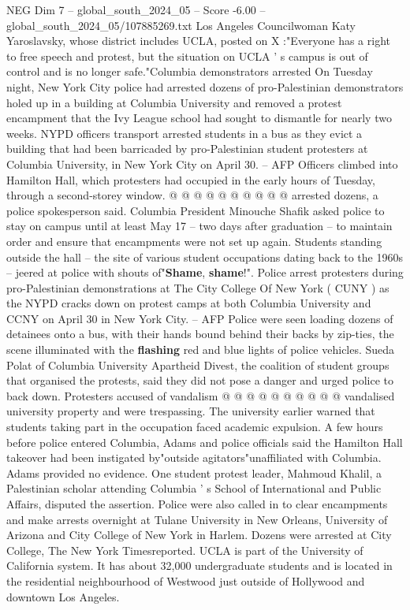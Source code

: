 \begin{textsample}{NEG Dim 7 – global\_south\_2024\_05 – Score -6.00 – global\_south\_2024\_05/107885269.txt}
Los Angeles Councilwoman Katy Yaroslavsky, whose district includes UCLA, posted on X :"Everyone has a right to free speech and protest, but the situation on UCLA ' s campus is out of control and is no longer safe."Columbia demonstrators arrested On Tuesday night, New York City police had arrested dozens of pro-Palestinian demonstrators holed up in a building at Columbia University and removed a protest encampment that the Ivy League school had sought to dismantle for nearly two weeks.
NYPD officers transport arrested students in a bus as they evict a building that had been barricaded by pro-Palestinian student protesters at Columbia University, in New York City on April 30. -- AFP Officers climbed into Hamilton Hall, which protesters had occupied in the early hours of Tuesday, through a second-storey window. @ @ @ @ @ @ @ @ @ @ arrested dozens, a police spokesperson said.
Columbia President Minouche Shafik asked police to stay on campus until at least May 17 -- two days after graduation -- to maintain order and ensure that encampments were not set up again.
Students standing outside the hall -- the site of various student occupations dating back to the 1960s -- jeered at police with shouts of"\textbf{Shame}, \textbf{shame}!".
Police arrest protesters during pro-Palestinian demonstrations at The City College Of New York ( CUNY ) as the NYPD cracks down on protest camps at both Columbia University and CCNY on April 30 in New York City. -- AFP Police were seen loading dozens of detainees onto a bus, with their hands bound behind their backs by zip-ties, the scene illuminated with the \textbf{flashing} red and blue lights of police vehicles.
Sueda Polat of Columbia University Apartheid Divest, the coalition of student groups that organised the protests, said they did not pose a danger and urged police to back down.
Protesters accused of vandalism @ @ @ @ @ @ @ @ @ @ vandalised university property and were trespassing.
The university earlier warned that students taking part in the occupation faced academic expulsion.
A few hours before police entered Columbia, Adams and police officials said the Hamilton Hall takeover had been instigated by"outside agitators"unaffiliated with Columbia.
Adams provided no evidence.
One student protest leader, Mahmoud Khalil, a Palestinian scholar attending Columbia ' s School of International and Public Affairs, disputed the assertion.
Police were also called in to clear encampments and make arrests overnight at Tulane University in New Orleans, University of Arizona and City College of New York in Harlem.
Dozens were arrested at City College, The New York Timesreported.
UCLA is part of the University of California system.
It has about 32,000 undergraduate students and is located in the residential neighbourhood of Westwood just outside of Hollywood and downtown Los Angeles.

\end{textsample}
